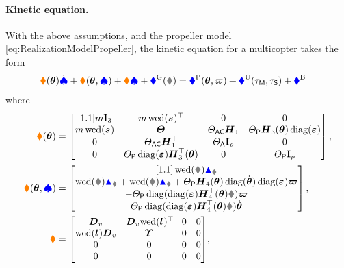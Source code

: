 \paragraph{Kinetic equation.}
With the above assumptions, and the propeller model \eqref{eq:RealizationModelPropeller}, the kinetic equation for a multicopter takes the form
\begin{align}\label{eq:RealizationMulticopterKinetics}
 \sysInertiaMat(\tuple{\PropTilt}) \sysVeld + \gyroForce(\tuple{\PropTilt}, \sysVel) + \sysDissMat \sysVel + \genForceGravity(\R) &= \genForceProp(\tuple{\PropTilt}, \PropVel) + \genForceInput(\BLDCTorque, \ServoTorque) + \genForceBias
\end{align}
where
\begin{subequations}\label{eq:RealizationMulticopterForces}
\begin{align}
 \sysInertiaMat(\tuple{\PropTilt}) &=
 \begin{bmatrix}[1.1]
  \m \idMat[3] & \m \wedOp(\bodyCOM{}{})^\top & 0 & 0 \\
  \m \wedOp(\bodyCOM{}{}) & \bodyMOI{}{}{} & \JAC \mat{H}_1 & \JP \mat{H}_3(\tuple{\PropTilt}) \diag(\tuple{\PropDir}) \\
  0 & \JAC \mat{H}_1^\top & \ArmInertia \idMat[\numProp] & 0 \\
  0 & \JP \diag(\tuple{\PropDir}) \mat{H}_3^\top(\tuple{\PropTilt}) & 0 & \PropInertia \idMat[\numProp]
 \end{bmatrix},
\\
 \gyroForce(\tuple{\PropTilt}, \sysVel) &= 
 \begin{bmatrix}[1.1]
  \wedOp(\w) \tuple{\genMomentumSym}_{\v} \\
  \wedOp(\v) \tuple{\genMomentumSym}_{\v} + \wedOp(\w) \tuple{\genMomentumSym}_{\w} + \JP \mat{H}_4(\tuple{\PropTilt}) \diag(\dot{\tuple{\PropTilt}}) \diag(\tuple{\PropDir}) \tuple{\PropVel} \\
  -\JP \diag( \diag(\tuple{\PropDir}) \mat{H}_4^\top(\tuple{\PropTilt}) \w) \tuple{\PropVel} \\
   \JP \diag( \diag(\tuple{\PropDir}) \mat{H}_4^\top(\tuple{\PropTilt}) \w) \dot{\tuple{\PropTilt}} \\
 \end{bmatrix},
\\
 \sysDissMat &= \begin{bmatrix} \mat{D}_v & \mat{D}_v \!\wedOp(\bodyCOD{}{})^\top\! & 0 & 0 \\ \wedOp(\bodyCOD{}{}) \mat{D}_v & \bodyMOD{}{}{} & 0 & 0 \\ 0 & 0 & 0 & 0 \\ 0 & 0 & 0 & 0 \end{bmatrix}\!,

\end{align}
\end{subequations}
